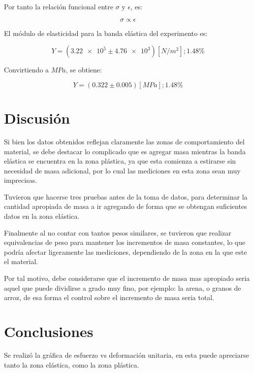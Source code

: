 \documentclass[letter,11pt]{article}
\begin{document}
Por tanto la relación funcional entre $\sigma$ y $\epsilon$, es:

\begin{equation*}
    \sigma \propto \epsilon
\end{equation*}
\vspace{0.10cm}

El módulo de elasticidad para la banda elástica del experimento es:

\begin{equation*}
    Y = (\num{3.22e5} \pm \num{4.76e3}) [N/m^2]; 1.48\%
\end{equation*}
\vspace{0.10cm}

Convirtiendo a $MPa$, se obtiene:

\begin{equation*}
    Y = (0.322 \pm 0.005) [MPa]; 1.48\%
\end{equation*}

\section{Discusión}

Si bien los datos obtenidos reflejan claramente las zonas de comportamiento del
material, se debe destacar lo complicado que es agregar masa mientras la banda
elástica se encuentra en la zona plástica, ya que esta comienza a estirarse sin
necesidad de masa adicional, por lo cual las mediciones en esta zona sean muy
imprecisas.

Tuvieron que hacerse tres pruebas antes de la toma de datos, para determinar la
cantidad apropiada de masa a ir agregando de forma que se obtengan suficientes
datos en la zona elástica.

Finalmente al no contar con tantos pesos similares, se tuvieron que realizar
equivalencias de peso para mantener los incrementos de masa constantes, lo que
podría afectar ligeramente las mediciones, dependiendo de la zona en la que este
el material.

Por tal motivo, debe considerarse que el incremento de masa mas apropiado seria
aquel que puede dividirse a grado muy fino, por ejemplo: la arena, o granos de
arroz, de esa forma el control sobre el incremento de masa seria total.

\section{Conclusiones}

Se realizó la gráfica de esfuerzo vs deformación unitaria, en esta puede
apreciarse tanto la zona elástica, como la zona plástica.
\end{document}
